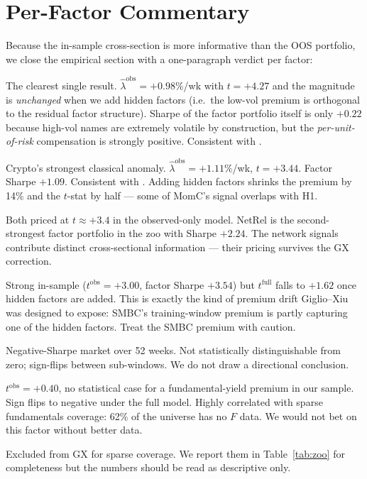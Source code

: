 \documentclass[11pt,a4paper]{article}
\begin{document}
\section{Per-Factor Commentary}\label{sec:commentary}

Because the in-sample cross-section is more informative than the OOS portfolio, we close the empirical section with a one-paragraph verdict per factor:

\begin{description}[topsep=2pt,itemsep=2pt,leftmargin=1.2em]
\item[VolC.] The clearest single result. $\hat\lambda^\text{obs}=+0.98\%$/wk with $t=+4.27$ and the magnitude is \emph{unchanged} when we add hidden factors (i.e.\ the low-vol premium is orthogonal to the residual factor structure). Sharpe of the factor portfolio itself is only $+0.22$ because high-vol names are extremely volatile by construction, but the \emph{per-unit-of-risk} compensation is strongly positive. Consistent with \citet{frazzinipedersen2014}.
\item[MomC.] Crypto's strongest classical anomaly. $\hat\lambda^\text{obs}=+1.11\%$/wk, $t=+3.44$. Factor Sharpe $+1.09$. Consistent with \citet{liu2022commonrisk}. Adding hidden factors shrinks the premium by 14\% and the $t$-stat by half --- some of MomC's signal overlaps with H1.
\item[NetMom, NetRel.] Both priced at $t\approx+3.4$ in the observed-only model. NetRel is the second-strongest factor portfolio in the zoo with Sharpe $+2.24$. The network signals contribute distinct cross-sectional information --- their pricing survives the GX correction.
\item[SMBC.] Strong in-sample ($t^\text{obs}=+3.00$, factor Sharpe $+3.54$) but $t^\text{full}$ falls to $+1.62$ once hidden factors are added. This is exactly the kind of premium drift Giglio--Xiu was designed to expose: SMBC's training-window premium is partly capturing one of the hidden factors. Treat the SMBC premium with caution.
\item[RC.] Negative-Sharpe market over 52 weeks. Not statistically distinguishable from zero; sign-flips between sub-windows. We do not draw a directional conclusion.
\item[FunC.] $t^\text{obs}=+0.40$, no statistical case for a fundamental-yield premium in our sample. Sign flips to negative under the full model. Highly correlated with sparse fundamentals coverage: 62\% of the universe has no $F$ data. We would not bet on this factor without better data.
\item[TVLC, SupC.] Excluded from GX for sparse coverage. We report them in Table~\ref{tab:zoo} for completeness but the numbers should be read as descriptive only.
\end{description}
\end{document}
